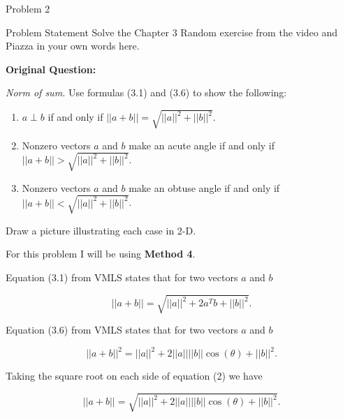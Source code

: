 \begin{problem}{Problem 2}
    \begin{statement}{Problem Statement}
        Solve the Chapter 3 Random exercise from the video and Piazza in your own words here. \vspace*{1em}

        \textbf{Original Question:} \vspace*{1em}

        \textit{Norm of sum.} Use formulas (3.1) and (3.6) to show the following:

        \begin{enumerate}[label=(\alph*)]
            \item $a \perp b$ if and only if $||a+b|| = \sqrt{||a||^{2} + ||b||^{2}}$.
            \item Nonzero vectors $a$ and $b$ make an acute angle if and only if $||a + b|| > \sqrt{||a||^{2} + ||b||^{2}}$.
            \item Nonzero vectors $a$ and $b$ make an obtuse angle if and only if $||a + b|| < \sqrt{||a||^{2} + ||b||^{2}}$.
        \end{enumerate}
        Draw a picture illustrating each case in 2-D.
    \end{statement}

    \begin{Highlight}
        For this problem I will be using \textbf{Method 4}. \vspace*{1em}

        Equation (3.1) from VMLS states that for two vectors $a$ and $b$

        \setcounter{equation}{0}
        \begin{equation}
            ||a + b|| = \sqrt{||a||^{2} + 2a^{T}b + ||b||^{2}}.
        \end{equation}

        Equation (3.6) from VMLS states that for two vectors $a$ and $b$

        \begin{equation}
            ||a + b||^{2} = ||a||^{2} + 2||a||||b||\cos{(\theta)} + ||b||^2.
        \end{equation}

        Taking the square root on each side of equation (2) we have

        \begin{equation}
            ||a + b|| = \sqrt{||a||^{2} + 2||a||||b||\cos{(\theta)} + ||b||^2}.
        \end{equation}


\end{Highlight}
\end{problem}
